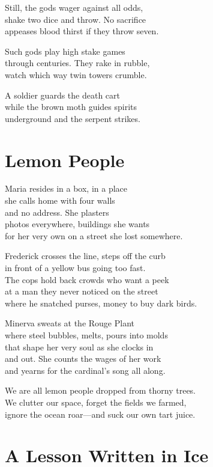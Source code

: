 \documentclass[twoside,10pt]{book}
\begin{document}
Still, the gods wager against all odds,\\
shake two dice and throw. No sacrifice\\
appeases blood thirst if they throw seven.

Such gods play high stake games\\
through centuries. They rake in rubble,\\
watch which way twin towers crumble.

A soldier guards the death cart\\
while the brown moth guides spirits\\
underground and the serpent strikes.


\clearpage
\section{Lemon People}

Maria resides in a box, in a place\\
she calls home with four walls\\
and no address. She plasters\\
photos everywhere, buildings she wants\\
for her very own on a street she lost somewhere.

Frederick crosses the line, steps off the curb\\
in front of a yellow bus going too fast.\\
The cops hold back crowds who want a peek\\
at a man they never noticed on the street\\
where he snatched purses, money to buy dark birds.

Minerva sweats at the Rouge Plant\\
where steel bubbles, melts, pours into molds\\
that shape her very soul as she clocks in\\
and out. She counts the wages of her work\\
and yearns for the cardinal's song all along.

We are all lemon people dropped from thorny trees.\\
We clutter our space, forget the fields we farmed,\\
ignore the ocean roar---and suck our own tart juice.


\clearpage
\section{A Lesson Written in Ice}
\end{document}
